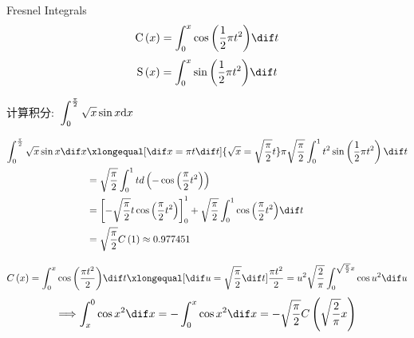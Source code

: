 \documentclass[color=green,titlestyle=hang]{elegantbook}%
\begin{document}
%

\begin{newdef}[菲涅尔积分函数]
Fresnel Integrals\[{\rm C}\left( x \right) = \int_0^x {\cos \left( {\frac{1}{2}\pi {t^2}} \right)} \dif t\]
\[{\rm S}\left( x \right) = \int_0^x {\sin \left( {\frac{1}{2}\pi {t^2}} \right)} \dif t\]
\end{newdef}

\begin{example}计算积分:~$\displaystyle \int_{\rm{0}}^{\frac{\pi }{{\rm{2}}}} {\sqrt x \sin x} \textrm{d}x$\end{example}
\begin{Solution}\begin{align*}
\int_{0}^{\frac{\pi }{{\rm{2}}}} {\sqrt x \sin x} \dif x &\xlongequal[\dif x = \pi t\dif t]{\sqrt x  = \sqrt {\frac{\pi }{2}} t} \pi \sqrt {\frac{\pi }{2}} \int_0^1 {{t^2}\sin } \left( {\frac{1}{2}\pi {t^2}} \right)\dif t\\
&= \sqrt {\frac{\pi }{2}} \int_0^1 t d\left( { - \cos \left( {\frac{\pi }{2}{t^2}} \right)} \right)\\
&= \left[ { - \sqrt {\frac{\pi }{2}} t\cos \left( {\frac{\pi }{2}{t^2}} \right)} \right]_0^1 + \sqrt {\frac{\pi }{2}} \int_0^1 {\cos \left( {\frac{\pi }{2}{t^2}} \right)} \dif t\\
&= \sqrt {\frac{\pi }{2}} C\left( 1 \right) \approx 0.977451\end{align*}	
\end{Solution}\[C\left( x \right) = \int_0^x {\cos \left( {\frac{{\pi {t^2}}}{2}} \right)} \dif t \xlongequal[{\dif u = \sqrt {\frac{\pi }{2}} \dif t}]{{\frac{{\pi {t^2}}}{2} = {u^2}}}\sqrt {\frac{2}{\pi }} \int_0^{\sqrt {\frac{\pi }{2}} x} {\cos {u^2}\dif u} \]
\[ \Longrightarrow \int_x^0 {\cos {x^2}} \dif x =  - \int_0^x {\cos {x^2}} \dif x =  - \sqrt {\frac{\pi }{2}} C\left( {\sqrt {\frac{2}{\pi }} x} \right)
\]
\end{document}
